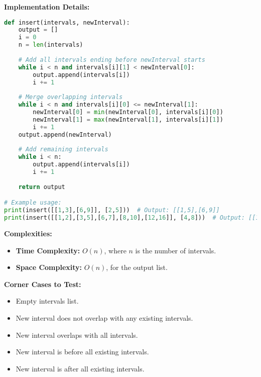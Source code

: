 \textbf{Implementation Details:}

\begin{fullwidth}
\begin{lstlisting}[language=Python]
def insert(intervals, newInterval):
    output = []
    i = 0
    n = len(intervals)
    
    # Add all intervals ending before newInterval starts
    while i < n and intervals[i][1] < newInterval[0]:
        output.append(intervals[i])
        i += 1
    
    # Merge overlapping intervals
    while i < n and intervals[i][0] <= newInterval[1]:
        newInterval[0] = min(newInterval[0], intervals[i][0])
        newInterval[1] = max(newInterval[1], intervals[i][1])
        i += 1
    output.append(newInterval)
    
    # Add remaining intervals
    while i < n:
        output.append(intervals[i])
        i += 1
    
    return output

# Example usage:
print(insert([[1,3],[6,9]], [2,5]))  # Output: [[1,5],[6,9]]
print(insert([[1,2],[3,5],[6,7],[8,10],[12,16]], [4,8]))  # Output: [[1,2],[3,10],[12,16]]
\end{lstlisting}
\end{fullwidth}

\textbf{Complexities:}

\begin{itemize}
    \item \textbf{Time Complexity:} \(O(n)\), where \(n\) is the number of intervals.
    \item \textbf{Space Complexity:} \(O(n)\), for the output list.
\end{itemize}

\textbf{Corner Cases to Test:}

\begin{itemize}
    \item Empty intervals list.
    \item New interval does not overlap with any existing intervals.
    \item New interval overlaps with all intervals.
    \item New interval is before all existing intervals.
    \item New interval is after all existing intervals.
\end{itemize}

